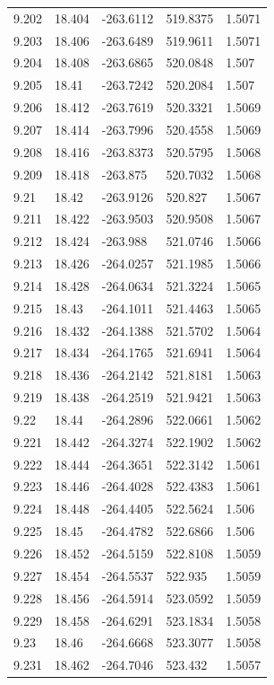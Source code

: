 \begin{tabular}{lllll}
9.202 & 18.404 & -263.6112 & 519.8375 & 1.5071 \\
9.203 & 18.406 & -263.6489 & 519.9611 & 1.5071 \\
9.204 & 18.408 & -263.6865 & 520.0848 & 1.507 \\
9.205 & 18.41 & -263.7242 & 520.2084 & 1.507 \\
9.206 & 18.412 & -263.7619 & 520.3321 & 1.5069 \\
9.207 & 18.414 & -263.7996 & 520.4558 & 1.5069 \\
9.208 & 18.416 & -263.8373 & 520.5795 & 1.5068 \\
9.209 & 18.418 & -263.875 & 520.7032 & 1.5068 \\
9.21 & 18.42 & -263.9126 & 520.827 & 1.5067 \\
9.211 & 18.422 & -263.9503 & 520.9508 & 1.5067 \\
9.212 & 18.424 & -263.988 & 521.0746 & 1.5066 \\
9.213 & 18.426 & -264.0257 & 521.1985 & 1.5066 \\
9.214 & 18.428 & -264.0634 & 521.3224 & 1.5065 \\
9.215 & 18.43 & -264.1011 & 521.4463 & 1.5065 \\
9.216 & 18.432 & -264.1388 & 521.5702 & 1.5064 \\
9.217 & 18.434 & -264.1765 & 521.6941 & 1.5064 \\
9.218 & 18.436 & -264.2142 & 521.8181 & 1.5063 \\
9.219 & 18.438 & -264.2519 & 521.9421 & 1.5063 \\
9.22 & 18.44 & -264.2896 & 522.0661 & 1.5062 \\
9.221 & 18.442 & -264.3274 & 522.1902 & 1.5062 \\
9.222 & 18.444 & -264.3651 & 522.3142 & 1.5061 \\
9.223 & 18.446 & -264.4028 & 522.4383 & 1.5061 \\
9.224 & 18.448 & -264.4405 & 522.5624 & 1.506 \\
9.225 & 18.45 & -264.4782 & 522.6866 & 1.506 \\
9.226 & 18.452 & -264.5159 & 522.8108 & 1.5059 \\
9.227 & 18.454 & -264.5537 & 522.935 & 1.5059 \\
9.228 & 18.456 & -264.5914 & 523.0592 & 1.5059 \\
9.229 & 18.458 & -264.6291 & 523.1834 & 1.5058 \\
9.23 & 18.46 & -264.6668 & 523.3077 & 1.5058 \\
9.231 & 18.462 & -264.7046 & 523.432 & 1.5057 \\

\end{tabular}
